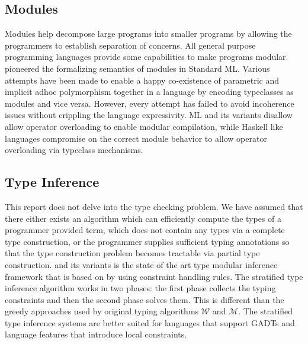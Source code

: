 \documentclass[screen,nonacm]{acmart}
\begin{document}
\subsection{Modules}\label{sec:rw-modules}
Modules help decompose large programs into smaller programs by allowing the programmers to establish separation of concerns. All general purpose programming languages provide some capabilities to make programs modular. \citet{macqueen_modules_1984} pioneered the formalizing semantics of modules in Standard ML.
Various attempts\cite{dreyer_modular_2007, wehr_ml_2008, white_modular_2014} have been made to enable a happy co-existence of parametric and implicit adhoc polymorphism together in a language by encoding typeclasses as modules and vice versa. However, every attempt has failed to avoid incoherence issues without crippling the language expressivity. ML and its variants\cite{milner_definition_1997,leroy_ocaml_2023} disallow allow operator overloading to enable modular compilation, while Haskell like languages compromise on the correct module behavior to allow operator overloading via typeclass mechanisms.


\subsection{Type Inference}\label{sec:rw-type-inf}
This report does not delve into the type checking problem. We have assumed that there either exists an algorithm which can efficiently compute the types of a programmer provided term, which does not contain any types via a complete type construction\cite{milner_theory_1978}, or the programmer supplies sufficient typing annotations so that the type construction problem becomes tractable via partial type construction\cite{pierce_local_2000, dunfield_bidirectional_2021}. \HMX and its variants is the state of the art type modular inference framework that is based on by using constraint handling rules. The stratified type inference algorithm\cite{pottier_stratified_2006} works in two phases: the first phase collects the typing constraints and then the second phase solves them. This is different than the greedy approaches used by original typing algorithms\cite{lee_proofs_1998} $\mathcal{W}$ and $\mathcal{M}$. The stratified type inference systems are better suited for languages that support GADTs and language features that introduce local constraints\cite{vytiniotis_outsideinx_2011}.
\end{document}
